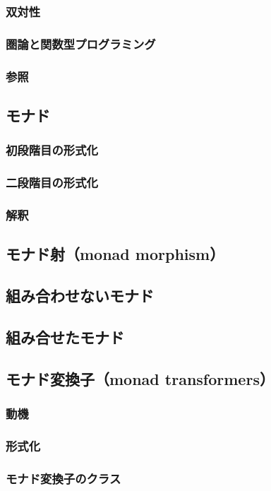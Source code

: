 \documentclass[11pt, oneside]{jsarticle}   	%
\begin{document}
\subsubsection{ 双対性 }
\subsubsection{ 圏論と関数型プログラミング }
\subsubsection{ 参照 }
\subsection{ モナド }
\subsubsection{ 初段階目の形式化 }
\subsubsection{ 二段階目の形式化 }
\subsubsection{ 解釈 }
\subsection{ モナド射（monad morphism） }
\subsection{ 組み合わせないモナド }
\subsection{ 組み合せたモナド }
\subsection{ モナド変換子（monad transformers） }
\subsubsection{  動機 }
\subsubsection{  形式化 }
\subsubsection{ モナド変換子のクラス }
\end{document}
